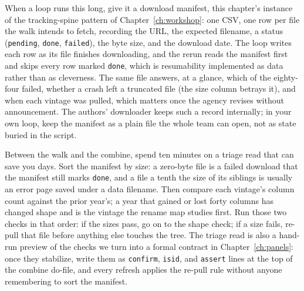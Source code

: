 When a loop runs this long, give it a download manifest, this chapter's instance of the tracking-spine pattern of Chapter~\ref{ch:workshop}: one CSV, one row per file the walk intends to fetch, recording the URL, the expected filename, a status (\texttt{pending}, \texttt{done}, \texttt{failed}), the byte size, and the download date. The loop writes each row as its file finishes downloading, and the rerun reads the manifest first and skips every row marked \texttt{done}, which is resumability implemented as data rather than as cleverness. The same file answers, at a glance, which of the eighty-four failed, whether a crash left a truncated file (the size column betrays it), and when each vintage was pulled, which matters once the agency revises without announcement. The authors' downloader keeps such a record internally; in your own loop, keep the manifest as a plain file the whole team can open, not as state buried in the script.

Between the walk and the combine, spend ten minutes on a triage read that can save you days. Sort the manifest by size: a zero-byte file is a failed download that the manifest still marks \texttt{done}, and a file a tenth the size of its siblings is usually an error page saved under a data filename. Then compare each vintage's column count against the prior year's; a year that gained or lost forty columns has changed shape and is the vintage the rename map studies first. Run those two checks in that order: if the sizes pass, go on to the shape check; if a size fails, re-pull that file before anything else touches the tree. The triage read is also a hand-run preview of the checks we turn into a formal contract in Chapter~\ref{ch:panels}: once they stabilize, write them as \texttt{confirm}, \texttt{isid}, and \texttt{assert} lines at the top of the combine do-file, and every refresh applies the re-pull rule without anyone remembering to sort the manifest.

